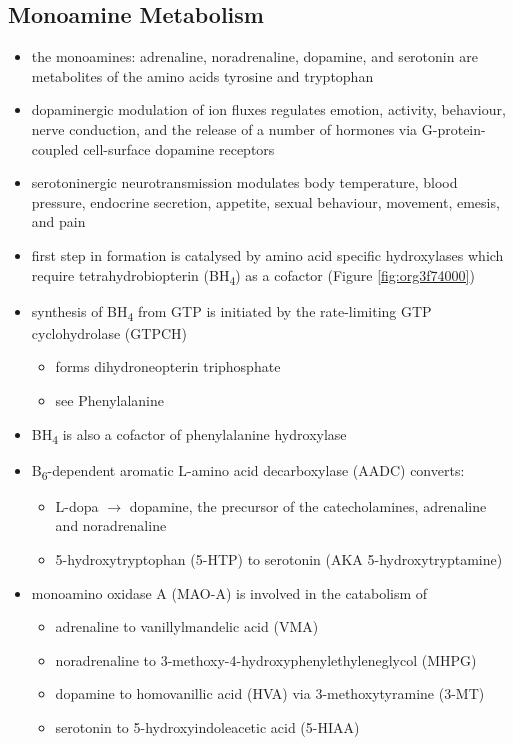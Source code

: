 \documentclass[12pt]{scrartcl}
\begin{document}
\subsection{Monoamine Metabolism}
\label{sec:org0fe89de}
\begin{itemize}
\item the monoamines: adrenaline, noradrenaline, dopamine, and serotonin
are metabolites of the amino acids tyrosine and tryptophan
\item dopaminergic modulation of ion fluxes regulates emotion, activity,
behaviour, nerve conduction, and the release of a number of hormones
via G-protein-coupled cell-surface dopamine
receptors
\item serotoninergic neurotransmission modulates body temperature, blood
pressure, endocrine secretion, appetite, sexual behaviour, movement,
emesis, and pain
\item first step in formation is catalysed by amino acid specific
hydroxylases which require tetrahydrobiopterin (BH\textsubscript{4}) as a cofactor
(Figure \ref{fig:org3f74000})
\item synthesis of BH\textsubscript{4} from GTP is initiated by the rate-limiting GTP
cyclohydrolase (GTPCH)
\begin{itemize}
\item forms dihydroneopterin triphosphate
\item see Phenylalanine
\end{itemize}
\item BH\textsubscript{4} is also a cofactor of phenylalanine hydroxylase
\item B\textsubscript{6}-dependent aromatic L-amino acid decarboxylase (AADC) converts:
\begin{itemize}
\item L-dopa \(\to\) dopamine, the precursor of the catecholamines,
adrenaline and noradrenaline
\item 5-hydroxytryptophan (5-HTP) to serotonin (AKA 5-hydroxytryptamine)
\end{itemize}
\item monoamino oxidase A (MAO-A) is involved in the catabolism of
\begin{itemize}
\item adrenaline to vanillylmandelic acid (VMA)
\item noradrenaline to 3-methoxy-4-hydroxyphenylethyleneglycol (MHPG)
\item dopamine to homovanillic acid (HVA) via 3-methoxytyramine (3-MT)
\item serotonin to 5-hydroxyindoleacetic acid (5-HIAA)
\end{itemize}
\end{itemize}
\end{document}
